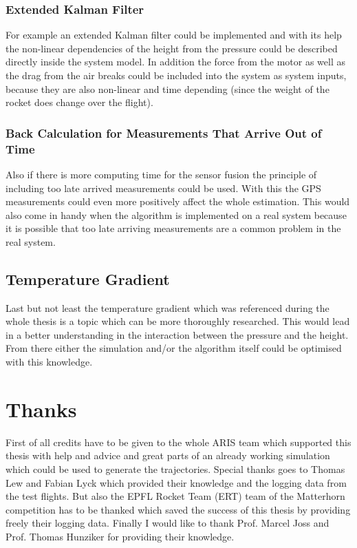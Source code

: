 \subsubsection{Extended Kalman Filter}
For example an extended Kalman filter could be implemented and with its help the non-linear dependencies of the height from the pressure
could be described directly inside the system model.
In addition the force from the motor as well as the drag from the air breaks could be included into the system as system inputs, because they are also non-linear and time depending (since the weight of the rocket does change over the flight).

\subsubsection{Back Calculation for Measurements That Arrive Out of Time}
Also if there is more computing time for the sensor fusion the principle of including too late arrived measurements could be used.
With this the GPS measurements could even more positively affect the whole estimation.
This would also come in handy when the algorithm is implemented on a real system because
it is possible that too late arriving measurements are a common problem in the real system.

\subsection{Temperature Gradient}
Last but not least the temperature gradient which was referenced during the whole thesis is a topic which can be more thoroughly researched.
This would lead in a better understanding in the interaction between the pressure and the height.
From there either the simulation and/or the algorithm itself could be optimised with this knowledge.

\section{Thanks}
First of all credits have to be given to the whole ARIS team which supported this thesis with help and advice and great parts of an already working simulation which could be used to generate the trajectories.
Special thanks goes to Thomas Lew and Fabian Lyck which provided their knowledge and the logging data from the test flights.
But also the EPFL Rocket Team (ERT) team of the Matterhorn competition has to be thanked which saved the success of this thesis by providing freely their logging data.
Finally I would like to thank Prof. Marcel Joss and Prof. Thomas Hunziker for providing their knowledge.

